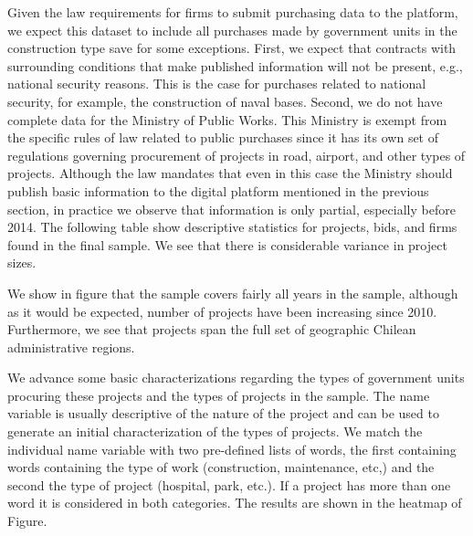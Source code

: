 Given the law requirements for firms to submit purchasing data to the platform, we expect this dataset to include all purchases made by government units in the construction type save for some exceptions. First, we expect that contracts with surrounding conditions that make published information will not be present, e.g., national security reasons. This is the case for purchases related to national security, for example, the construction of naval bases. Second, we do not have complete data for the Ministry of Public Works. This Ministry is exempt from the specific rules of law related to public purchases since it has its own set of regulations governing procurement of projects in road, airport, and other types of projects. Although the law mandates that even in this case the Ministry should publish basic information to the digital platform mentioned in the previous section, in practice we observe that information is only partial, especially before 2014.
The following table show descriptive statistics for projects, bids, and firms found in the final sample. We see that there is considerable variance in project sizes.

We show in figure that the sample covers fairly all years in the sample, although as it would be expected, number of projects have been increasing since 2010. Furthermore, we see that projects span the full set of geographic Chilean administrative regions.

We advance some basic characterizations regarding the types of government units procuring these projects and the types of projects in the sample. The name variable is usually descriptive of the nature of the project and can be used to generate an initial characterization of the types of projects. We match the individual name variable with two pre-defined lists of words, the first containing words containing the type of work (construction, maintenance, etc,) and the second the type of project (hospital, park, etc.). If a project has more than one word it is considered in both categories. The results are shown in the heatmap of Figure.
